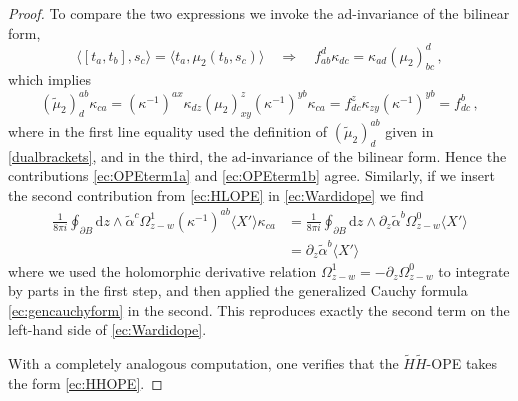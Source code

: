 \documentclass[11pt]{amsart}
\newcommand{\ta}{{\tilde \alpha}}
\newcommand{\tH}{{\tilde H}}
\numberwithin{equation}{section}
\numberwithin{figure}{section}
\numberwithin{table}{section}
\renewcommand{\d}{\mathrm{d}}
\theoremstyle{thm}
\numberwithin{equation}{subsection}
\theoremstyle{definition}
\theoremstyle{rem}
\newtheorem{remark}{Remark}
\begin{document}
\begin{proof}
To compare the two expressions we invoke the ad-invariance of the bilinear form,
\begin{equation}
    \langle [t_a,t_b],s_c\rangle = \langle t_a,\mu_2(t_b,s_c)\rangle 
    \quad\Rightarrow\quad 
    f_{ab}^d \kappa_{dc} = \kappa_{ad}(\mu_2)_{bc}^d\,,
\end{equation}
which implies
\begin{equation}
    (\tilde\mu_2)^{ab}_d \kappa_{ca}  
    = (\kappa^{-1})^{ax}\kappa_{dz}(\mu_2)_{xy}^z(\kappa^{-1})^{yb}\kappa_{ca}
    = f^z_{dc}\kappa_{zy}(\kappa^{-1})^{yb}= f^b_{dc}\,,
\end{equation}
where in the first line equality used the definition of $(\tilde\mu_2)^{ab}_d$ given in \eqref{dualbrackets}, and in the third, the $\mathrm{ad}$-invariance of the bilinear form. Hence the contributions \eqref{ec:OPEterm1a} and \eqref{ec:OPEterm1b} agree. Similarly, if we insert the second contribution from \eqref{ec:HLOPE} in \eqref{ec:Wardidope} we find
\begin{equation}
 \begin{split}
\label{ec:OPEterm2a}
    \frac{1}{8\pi i}\oint_{\partial B}\d z\wedge \ta^c \Omega_{z-w}^1 
        (\kappa^{-1})^{ab} \langle X'\rangle \kappa_{ca}
    & =\frac{1}{8\pi i}\oint_{\partial B}\d z\wedge \partial_z\ta^b \Omega_{z-w}^0 
         \langle X'\rangle \\
         &= \partial_z \ta^b\langle X'\rangle
\end{split}   
\end{equation}
where we used the holomorphic derivative relation $\Omega_{z-w}^1=-\partial_z\Omega_{z-w}^0$ 
to integrate by parts in the first step, and then applied the generalized Cauchy
formula \eqref{ec:gencauchyform} in the second. This reproduces exactly the 
second term on the left-hand side of \eqref{ec:Wardidope}.

With a completely analogous computation, one verifies that the $\tH \tH$-OPE takes the form \eqref{ec:HHOPE}.

\end{proof}


\end{document}
